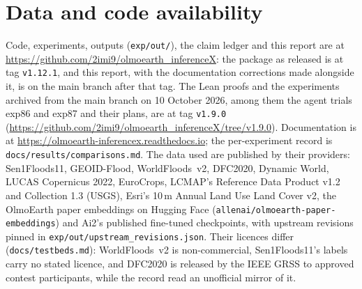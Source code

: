 \documentclass[11pt,a4paper]{article}
\newcommand{\code}[1]{\texttt{#1}}
\begin{document}
\section{Data and code availability}
\label{sec:avail}

\begin{sloppypar}
Code, experiments, outputs (\code{exp/out/}), the claim ledger and this report are at
\url{https://github.com/2imi9/olmoearth_inferenceX}: the package as released is at tag \code{v1.12.1}, and this report,
with the documentation corrections made alongside it, is on the main branch after that tag. The Lean proofs and the
experiments archived from the main branch on 10 October 2026, among them the agent trials exp86 and exp87 and their
plans, are at tag \code{v1.9.0} (\url{https://github.com/2imi9/olmoearth_inferenceX/tree/v1.9.0}). Documentation is at
\url{https://olmoearth-inferencex.readthedocs.io}; the per-experiment record is \code{docs/results/comparisons.md}. The
data used are published by their providers: Sen1Floods11, GEOID-Flood, WorldFloods~v2, DFC2020, Dynamic World, LUCAS
Copernicus 2022, EuroCrops, LCMAP's Reference Data Product v1.2 and Collection 1.3 (USGS), Esri's 10\,m Annual Land Use
Land Cover v2, the OlmoEarth paper embeddings on Hugging Face (\nolinkurl{allenai/olmoearth-paper-embeddings}) and
Ai2's published fine-tuned checkpoints, with upstream revisions pinned in \code{exp/out/upstream\_revisions.json}.
Their licences differ (\code{docs/testbeds.md}): WorldFloods~v2 is non-commercial, Sen1Floods11's labels carry no
stated licence, and DFC2020 is released by the IEEE GRSS to approved contest participants, while the record read an
unofficial mirror of it.
\end{sloppypar}



\end{document}
